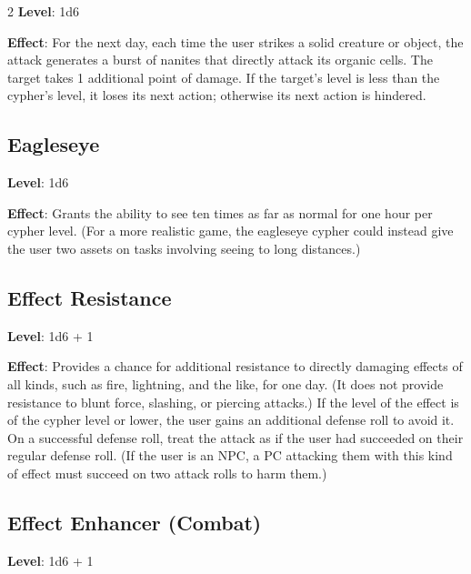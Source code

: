 \begin{multicols}{2}
\textbf{Level}: 1d6

\textbf{Effect}: For the next day, each time the user strikes a solid creature or object, the attack generates a burst of nanites that directly attack its organic cells. The target takes 1 additional point of damage. If the target’s level is less than the cypher’s level, it loses its next action; otherwise its next action is hindered.

\subsection{Eagleseye}

\textbf{Level}: 1d6

\textbf{Effect}: Grants the ability to see ten times as far as normal for one hour per cypher level. (For a more realistic game, the eagleseye cypher could instead give the user two assets on tasks involving seeing to long distances.)

\subsection{Effect Resistance}

\textbf{Level}: 1d6 + 1

\textbf{Effect}: Provides a chance for additional resistance to directly damaging effects of all kinds, such as fire, lightning, and the like, for one day. (It does not provide resistance to blunt force, slashing, or piercing attacks.) If the level of the effect is of the cypher level or lower, the user gains an additional defense roll to avoid it. On a successful defense roll, treat the attack as if the user had succeeded on their regular defense roll. (If the user is an NPC, a PC attacking them with this kind of effect must succeed on two attack rolls to harm them.)

\subsection{Effect Enhancer (Combat)}

\textbf{Level}: 1d6 + 1


\end{multicols}
